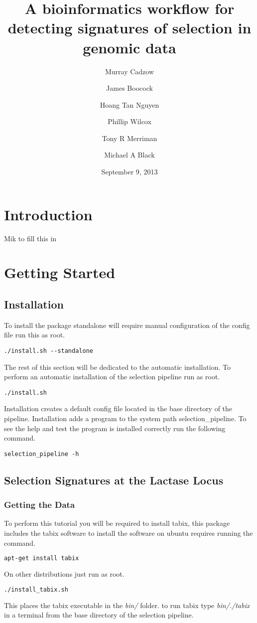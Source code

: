 \documentclass[a4paper,10pt]{article}
\title{\textbf{A bioinformatics workflow for detecting signatures of selection in genomic data}}
\date{September 9, 2013}
\author[1,2]{Murray Cadzow}
\author[1,2]{James Boocock}
\author[1,2]{Hoang Tan Nguyen}
\author[2,3]{Phillip Wilcox}
\author[1]{Tony R Merriman}
\author[1]{Michael A Black}
\affil[1]{Department of Biochemistry, University of Otago}
\affil[2]{Department of Mathematics and Statistics, University of Otago}
\affil[3]{Scion Research, Rotorua, New Zealand}
\begin{document}
\maketitle{}
\doublespacing
\tableofcontents





\section{Introduction}
Mik to fill this in
\section{Getting Started}
\subsection{Installation}
To install the package standalone will require manual configuration of the config file run this as root.
\begin{verbatim}
./install.sh --standalone
\end{verbatim}

The rest of this section will be dedicated to the automatic installation. To perform an automatic installation of the selection pipeline run as root.
\begin{verbatim}
./install.sh
\end{verbatim}

Installation creates a default config file located in the base directory of the pipeline. Installation adds a program to the system path selection\_pipeline. To see the help and test the program is installed correctly run the following command.

\begin{verbatim}
selection_pipeline -h
\end{verbatim}

\subsection{Selection Signatures at the Lactase Locus}
\subsubsection{Getting the Data}
To perform this tutorial you will be required to install tabix, this package includes the tabix software to install the software on ubuntu requires running the command.
\begin{lstlisting}[language=Bash]
apt-get install tabix
\end{lstlisting}
On other distributions just run as root. 
\begin{lstlisting}[language=Bash]
./install_tabix.sh
\end{lstlisting}
This places the tabix executable in the \emph{bin/} folder. to run tabix type \emph{bin/./tabix} in a terminal from the base directory of the selection pipeline.
\end{document}
